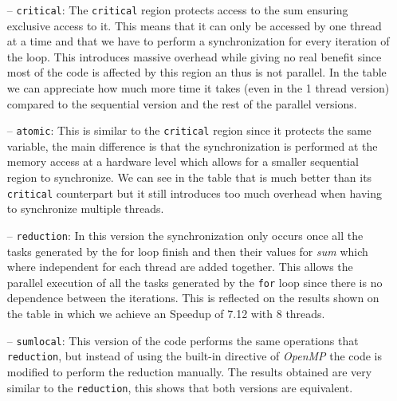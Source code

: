 \begin{itemize}
\item[--] \texttt{critical}: The \texttt{critical} region protects access to the sum ensuring exclusive access to it. This means
that it can only be accessed by one thread at a time and that we have to perform a synchronization for every iteration of the loop.
This introduces massive overhead while giving no real benefit since most of the code is affected by this region an thus is not
parallel. In the table we can appreciate how much more time it takes (even in the 1 thread version) compared to the sequential version
and the rest of the parallel versions.
\item[--] \texttt{atomic}: This is similar to the \texttt{critical} region since it protects the same variable, the main difference
is that the synchronization is performed at the memory access at a hardware level which allows for a smaller sequential region to
synchronize. We can see in the table that is much better than its \texttt{critical} counterpart but it still introduces too much
overhead when having to synchronize multiple threads.
\item[--] \texttt{reduction}: In this version the synchronization only occurs once all the tasks generated by the for loop finish
and then their values for \emph{sum} which where independent for each thread are added together. This allows the parallel execution
of all the tasks generated by the \texttt{for} loop since there is no dependence between the iterations. This is reflected on the
results shown on the table in which we achieve an Speedup of 7.12 with 8 threads.
\item[--] \texttt{sumlocal}: This version of the code performs the same operations that \texttt{reduction}, but instead of
using the built-in directive of \emph{OpenMP} the code is modified to perform the reduction manually. The results obtained are
very similar to the \texttt{reduction}, this shows that both versions are equivalent.
\end{itemize}



